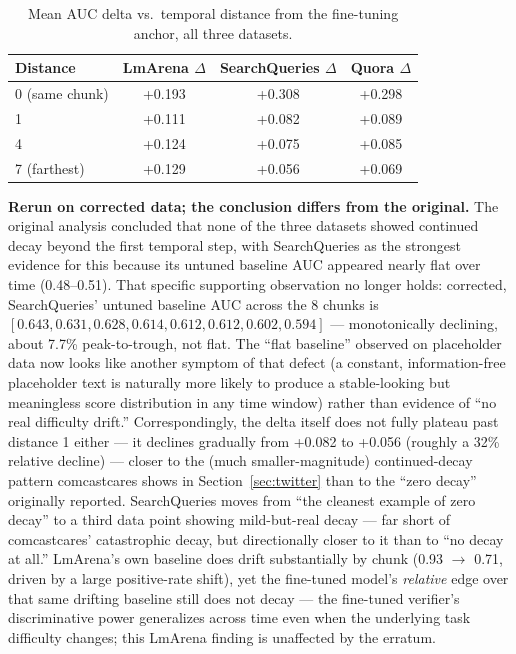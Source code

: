 \documentclass[11pt]{article}
\newenvironment{fittab}{\begin{lrbox}{\fittabbox}}{\end{lrbox}%
  \ifdim\wd\fittabbox>\linewidth\resizebox{\linewidth}{!}{\usebox{\fittabbox}}\else\usebox{\fittabbox}\fi}
\begin{document}
\begin{table}[h]
\centering
\small
\begin{fittab}\begin{tabular}{@{}lccc@{}}
\toprule
\textbf{Distance} & \textbf{LmArena $\Delta$} & \textbf{SearchQueries $\Delta$} & \textbf{Quora $\Delta$} \\
\midrule
0 (same chunk) & +0.193 & +0.308 & +0.298 \\
1 & +0.111 & +0.082 & +0.089 \\
4 & +0.124 & +0.075 & +0.085 \\
7 (farthest) & +0.129 & +0.056 & +0.069 \\
\bottomrule
\end{tabular}\end{fittab}
\caption{Mean AUC delta vs.\ temporal distance from the fine-tuning anchor, all three datasets.}
\end{table}

\textbf{Rerun on corrected data; the conclusion differs from the original.} The original analysis concluded that none of the three datasets showed continued decay beyond the first temporal step, with SearchQueries as the strongest evidence for this because its untuned baseline AUC appeared nearly flat over time (0.48--0.51). That specific supporting observation no longer holds: corrected, SearchQueries' untuned baseline AUC across the 8 chunks is $[0.643, 0.631, 0.628, 0.614, 0.612, 0.612, 0.602, 0.594]$ --- monotonically declining, about 7.7\% peak-to-trough, not flat. The ``flat baseline'' observed on placeholder data now looks like another symptom of that defect (a constant, information-free placeholder text is naturally more likely to produce a stable-looking but meaningless score distribution in any time window) rather than evidence of ``no real difficulty drift.'' Correspondingly, the delta itself does not fully plateau past distance 1 either --- it declines gradually from +0.082 to +0.056 (roughly a 32\% relative decline) --- closer to the (much smaller-magnitude) continued-decay pattern comcastcares shows in Section~\ref{sec:twitter} than to the ``zero decay'' originally reported. SearchQueries moves from ``the cleanest example of zero decay'' to a third data point showing mild-but-real decay --- far short of comcastcares' catastrophic decay, but directionally closer to it than to ``no decay at all.'' LmArena's own baseline does drift substantially by chunk (0.93 $\to$ 0.71, driven by a large positive-rate shift), yet the fine-tuned model's \emph{relative} edge over that same drifting baseline still does not decay --- the fine-tuned verifier's discriminative power generalizes across time even when the underlying task difficulty changes; this LmArena finding is unaffected by the erratum.
\end{document}
